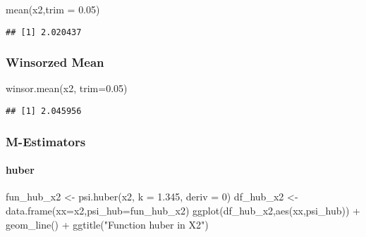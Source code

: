 \documentclass[
]{article}
\newenvironment{Shaded}{\begin{snugshade}}{\end{snugshade}}
\newcommand{\AttributeTok}[1]{\textcolor[rgb]{0.77,0.63,0.00}{#1}}
\newcommand{\DecValTok}[1]{\textcolor[rgb]{0.00,0.00,0.81}{#1}}
\newcommand{\FloatTok}[1]{\textcolor[rgb]{0.00,0.00,0.81}{#1}}
\newcommand{\FunctionTok}[1]{\textcolor[rgb]{0.00,0.00,0.00}{#1}}
\newcommand{\NormalTok}[1]{#1}
\newcommand{\OtherTok}[1]{\textcolor[rgb]{0.56,0.35,0.01}{#1}}
\newcommand{\SpecialCharTok}[1]{\textcolor[rgb]{0.00,0.00,0.00}{#1}}
\newcommand{\StringTok}[1]{\textcolor[rgb]{0.31,0.60,0.02}{#1}}
\begin{document}
\begin{Shaded}
\begin{Highlighting}[]
\FunctionTok{mean}\NormalTok{(x2,}\AttributeTok{trim =} \FloatTok{0.05}\NormalTok{)}
\end{Highlighting}
\end{Shaded}

\begin{verbatim}
## [1] 2.020437
\end{verbatim}

\hypertarget{winsorzed-mean-1}{%
\subsubsection{Winsorzed Mean}\label{winsorzed-mean-1}}

\begin{Shaded}
\begin{Highlighting}[]
\FunctionTok{winsor.mean}\NormalTok{(x2, }\AttributeTok{trim=}\FloatTok{0.05}\NormalTok{)}
\end{Highlighting}
\end{Shaded}

\begin{verbatim}
## [1] 2.045956
\end{verbatim}

\hypertarget{m-estimators-1}{%
\subsubsection{M-Estimators}\label{m-estimators-1}}

\hypertarget{huber-1}{%
\paragraph{huber}\label{huber-1}}

\begin{Shaded}
\begin{Highlighting}[]
\NormalTok{fun\_hub\_x2 }\OtherTok{\textless{}{-}} \FunctionTok{psi.huber}\NormalTok{(x2, }\AttributeTok{k =} \FloatTok{1.345}\NormalTok{, }\AttributeTok{deriv =} \DecValTok{0}\NormalTok{)}
\NormalTok{df\_hub\_x2 }\OtherTok{\textless{}{-}} \FunctionTok{data.frame}\NormalTok{(}\AttributeTok{xx=}\NormalTok{x2,}\AttributeTok{psi\_hub=}\NormalTok{fun\_hub\_x2)}
\FunctionTok{ggplot}\NormalTok{(df\_hub\_x2,}\FunctionTok{aes}\NormalTok{(xx,psi\_hub)) }\SpecialCharTok{+} 
  \FunctionTok{geom\_line}\NormalTok{() }\SpecialCharTok{+} \FunctionTok{ggtitle}\NormalTok{(}\StringTok{"Function huber in X2"}\NormalTok{)}
\end{Highlighting}
\end{Shaded}
\end{document}
